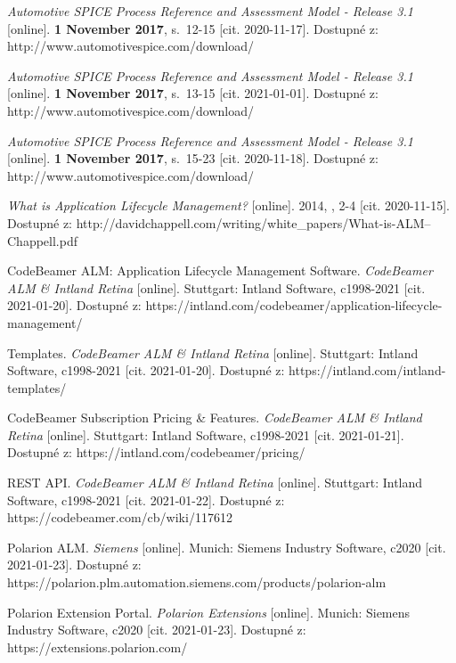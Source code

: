 \documentclass[czech,master]{diploma}
\begin{document}
\begin{thebibliography}{43}
\textit{Automotive SPICE Process Reference and Assessment Model - Release 3.1} [online]. \textbf{1 November 2017}, s.~12-15 [cit. 2020-11-17]. Dostupné z: http://www.automotivespice.com/download/


\textit{Automotive SPICE Process Reference and Assessment Model - Release 3.1} [online]. \textbf{1 November 2017}, s.~13-15 [cit. 2021-01-01]. Dostupné z: http://www.automotivespice.com/download/

\textit{Automotive SPICE Process Reference and Assessment Model - Release 3.1} [online]. \textbf{1 November 2017}, s.~15-23 [cit. 2020-11-18]. Dostupné z: http://www.automotivespice.com/download/

\textit{What is Application Lifecycle Management?} [online]. 2014, , 2-4 [cit. 2020-11-15]. Dostupné z: http://davidchappell.com/writing/white\_papers/What-is-ALM--Chappell.pdf

CodeBeamer ALM: Application Lifecycle Management Software. \textit{CodeBeamer ALM \& Intland Retina }[online]. Stuttgart: Intland Software, c1998-2021 [cit. 2021-01-20]. Dostupné z: https://intland.com/codebeamer/application-lifecycle-management/

Templates. \textit{CodeBeamer ALM \& Intland Retina} [online]. Stuttgart: Intland Software, c1998-2021 [cit. 2021-01-20]. Dostupné z: https://intland.com/intland-templates/

CodeBeamer Subscription Pricing \& Features. \textit{CodeBeamer ALM \& Intland Retina} [online]. Stuttgart: Intland Software, c1998-2021 [cit. 2021-01-21]. Dostupné z: https://intland.com/codebeamer/pricing/

REST API. \textit{CodeBeamer ALM \& Intland Retina} [online]. Stuttgart: Intland Software, c1998-2021 [cit. 2021-01-22]. Dostupné z: https://codebeamer.com/cb/wiki/117612

Polarion ALM. \textit{Siemens} [online]. Munich: Siemens Industry Software, c2020 [cit. 2021-01-23]. Dostupné z: https://polarion.plm.automation.siemens.com/products/polarion-alm

Polarion Extension Portal. \textit{Polarion Extensions} [online]. Munich: Siemens Industry Software, c2020 [cit. 2021-01-23]. Dostupné z: https://extensions.polarion.com/


\end{thebibliography}
\end{document}
